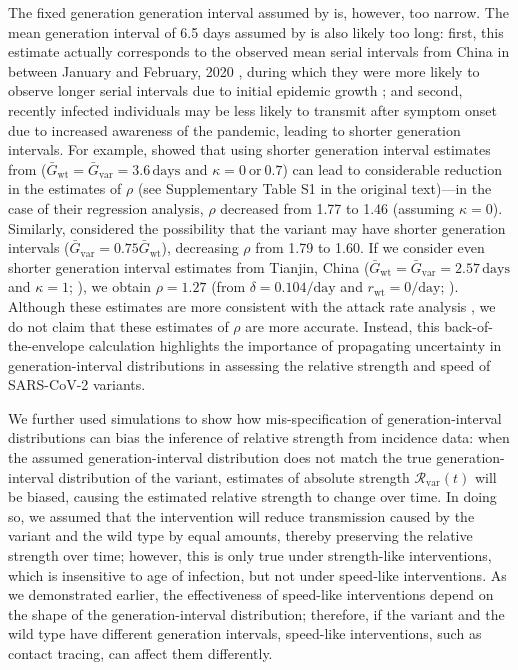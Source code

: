\documentclass[12pt]{article}
\newcommand{\vvvar}{\mathrm{var}}
\newcommand{\wwwt}{\mathrm{wt}}
\newcommand{\rx}[1]{\ensuremath{{r}_{#1}}\xspace}
\newcommand{\rw}{\rx{\wwwt}}
\newcommand{\Rx}[1]{\ensuremath{{\mathcal R}_{#1}}\xspace}
\newcommand{\Rv}{\Rx{\vvvar}}
\newcommand{\days}{\ensuremath{\, \textrm{days}}}
\newcommand{\pday}{\ensuremath{/\textrm{day}}}
\newcommand{\Gx}[1]{\ensuremath{{\bar G}_{#1}}\xspace}
\newcommand{\Gw}{\Gx{\wwwt}}
\newcommand{\Gv}{\Gx{\vvvar}}
\begin{document}
The fixed generation generation interval assumed by \cite{davies2021estimated} is, however, too narrow.
The mean generation interval of 6.5 days assumed by \cite{volz2021transmission} is also likely too long: 
first, this estimate actually corresponds to the observed mean serial intervals from China in between January and February, 2020 \citep{bi2020epidemiology}, during which they were more likely to observe longer serial intervals due to initial epidemic growth \citep{park2021forward, ali2020serial}; and second, recently infected individuals may be less likely to transmit after symptom onset due to increased awareness of the pandemic, leading to shorter generation intervals.
For example, \cite{davies2021estimated} showed that using shorter generation interval estimates from \cite{ganyani2020estimating} ($\Gw=\Gv=3.6\days$ and $\kappa=0\ \textrm{or}\ 0.7$) can lead to considerable reduction in the estimates of $\rho$ (see Supplementary Table S1 in the original text)---in the case of their regression analysis, $\rho$ decreased from 1.77 to 1.46 (assuming $\kappa = 0$).
Similarly, \cite{volz2021transmission} considered the possibility that the variant may have shorter generation intervals ($\Gv=0.75\Gw$), decreasing $\rho$ from 1.79 to 1.60.
If we consider even shorter generation interval estimates from Tianjin, China ($\Gw=\Gv=2.57\days$ and $\kappa=1$; \cite{ganyani2020estimating}), we obtain $\rho=1.27$ (from $\delta=0.104\pday$ and $\rw = 0\pday$; \cite{davies2021estimated}).
Although these estimates are more consistent with the attack rate analysis \citep{ukinvest},
we do not claim that these estimates of $\rho$ are more accurate.
Instead, this back-of-the-envelope calculation highlights the importance of propagating uncertainty in generation-interval distributions in assessing the relative strength and speed of SARS-CoV-2 variants.

We further used simulations to show how mis-specification of generation-interval distributions can bias the inference of relative strength from incidence data:
when the assumed generation-interval distribution does not match the true generation-interval distribution of the variant, estimates of absolute strength $\Rv(t)$ will be biased, causing the estimated relative strength to change over time.
In doing so, we assumed that the intervention will reduce transmission caused by the variant and the wild type by equal amounts, thereby preserving the relative strength over time;
however, this is only true under strength-like interventions, which is insensitive to age of infection, but not under speed-like interventions. 
As we demonstrated earlier, the effectiveness of speed-like interventions depend on the shape of the generation-interval distribution;
therefore, if the variant and the wild type have different generation intervals, speed-like interventions, such as contact tracing, can affect them differently.
\end{document}
